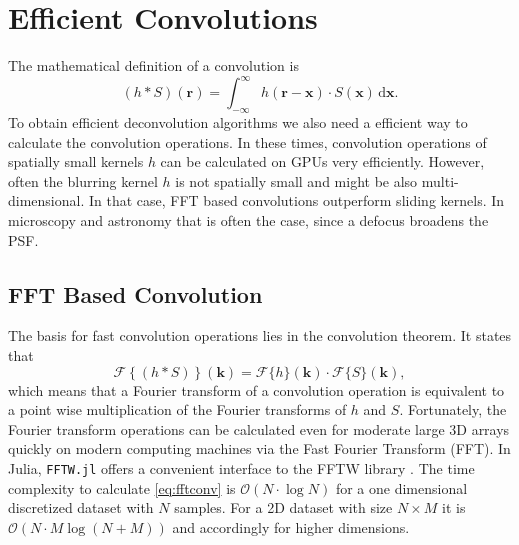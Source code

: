 \documentclass{juliacon}
\begin{document}
\section{Efficient Convolutions}
The mathematical definition of a convolution is
\begin{equation}
    (h * S)(\mathbf r) = \int_{-\infty}^{\infty} h(\mathbf r - \mathbf x) \cdot S(\mathbf x) \, \mathrm d \mathbf x.
    \label{eq:conv}
\end{equation}
To obtain efficient deconvolution algorithms we also need a efficient way to calculate the convolution operations.
In these times, convolution operations of spatially small kernels $h$ can be calculated on GPUs very efficiently.
However, often the blurring kernel $h$ is not spatially small and might be also multi-dimensional. In that case, FFT based convolutions
outperform sliding kernels. In microscopy and astronomy that is often the case, since a defocus broadens the PSF.

\subsection{FFT Based Convolution}
    The basis for fast convolution operations lies in the convolution theorem. It states that
    \begin{equation}
        \mathcal F\left\{(h * S)\right\}(\mathbf k) = \mathcal F\{h\} (\mathbf k) \cdot \mathcal F\{S\} (\mathbf k),
        \label{eq:fftconv}
    \end{equation} 
        which means that a Fourier transform of a  convolution operation is equivalent to a point wise multiplication of the Fourier transforms 
        of $h$ and $S$.
        Fortunately, the Fourier transform operations can be calculated even for moderate large 3D arrays quickly on modern computing machines via
        the Fast Fourier Transform (FFT).
        In Julia, \verb|FFTW.jl| offers a convenient interface to the FFTW library \cite{FFTW05}.
        The time complexity to calculate \autoref{eq:fftconv} is $\mathcal{O}(N \cdot \log N)$ for a one dimensional discretized dataset with $N$ samples.
        For a 2D dataset with size $N \times M$ it is $\mathcal{O}(N \cdot M \log(N + M))$ and accordingly for higher dimensions.
\end{document}
